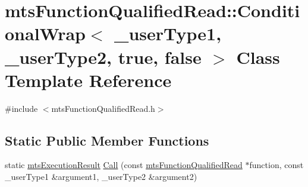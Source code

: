 \hypertarget{classmts_function_qualified_read_1_1_conditional_wrap_3_01__user_type1_00_01__user_type2_00_01true_00_01false_01_4}{\section{mts\-Function\-Qualified\-Read\-:\-:Conditional\-Wrap$<$ \-\_\-user\-Type1, \-\_\-user\-Type2, true, false $>$ Class Template Reference}
\label{classmts_function_qualified_read_1_1_conditional_wrap_3_01__user_type1_00_01__user_type2_00_01true_00_01false_01_4}
}


{\ttfamily \#include $<$mts\-Function\-Qualified\-Read.\-h$>$}

\subsection*{Static Public Member Functions}
\begin{DoxyCompactItemize}
\item 
static \hyperlink{classmts_execution_result}{mts\-Execution\-Result} \hyperlink{classmts_function_qualified_read_1_1_conditional_wrap_3_01__user_type1_00_01__user_type2_00_01true_00_01false_01_4_a22a1022660032d8f2af13159adc3697d}{Call} (const \hyperlink{classmts_function_qualified_read}{mts\-Function\-Qualified\-Read} $\ast$function, const \-\_\-user\-Type1 \&argument1, \-\_\-user\-Type2 \&argument2)
\end{DoxyCompactItemize}



